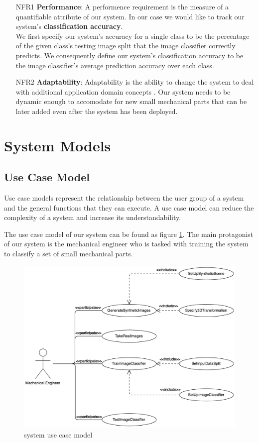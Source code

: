 \documentclass[a4paper,12pt,twoside]{report}
\begin{document}
\begin{itemize}
  \item [NFR1] \textbf{Performance}: A performence requirement is the measure of a quantifiable attribute of our system. In our case we would like to track our system's \textbf{classification accuracy}.\\
  We first specify our system's accuracy for a single class to be the percentage of the given class's testing image split that the image classifier correctly predicts. We consequently define our system's classification accuracy to be the image classifier's average prediction accuracy over each class.

  \item [NFR2] \textbf{Adaptability}: Adaptability is the ability to change the system to deal with additional application domain concepts \cite{bruegge2004object}. Our system needs to be dynamic enough to accomodate for new small mechanical parts that can be later added even after the system has been deployed.
\end{itemize}

\section{System Models}

\subsection{Use Case Model}

Use case models represent the relationship between the user group of a system and the general functions that they can execute. A use case model can reduce the complexity of a system and increase its understandability.

The use case model of our system can be found as figure \ref{fig:UseCaseModel}. The main protagonist of our system is the mechanical engineer who is tasked with training the system to classify a set of small mechanical parts.

\begin{figure}[t]
\centering
  \includegraphics[width=\textwidth]{UseCaseModel}
\caption{system use case model}
\label{fig:UseCaseModel}
\end{figure}
\end{document}
